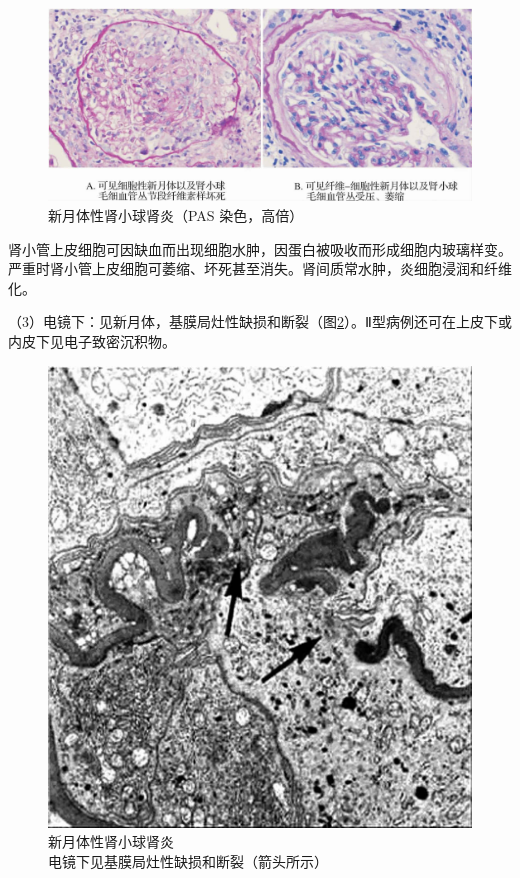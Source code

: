 \begin{figure}[!htbp]
 \centering
 \includegraphics{./images/Image00160.jpg}
 \captionsetup{justification=centering}
 \caption{新月体性肾小球肾炎（PAS 染色，高倍）}
 \label{fig10-13}
  \end{figure}

肾小管上皮细胞可因缺血而出现细胞水肿，因蛋白被吸收而形成细胞内玻璃样变。严重时肾小管上皮细胞可萎缩、坏死甚至消失。肾间质常水肿，炎细胞浸润和纤维化。

（3）电镜下：见新月体，基膜局灶性缺损和断裂（图\ref{fig10-14}）。Ⅱ型病例还可在上皮下或内皮下见电子致密沉积物。

\begin{figure}[!htbp]
 \centering
 \includegraphics{./images/Image00161.jpg}
 \captionsetup{justification=centering}
 \caption{新月体性肾小球肾炎\\ {\small 电镜下见基膜局灶性缺损和断裂（箭头所示）}}
\label{fig10-14}
  \end{figure}

